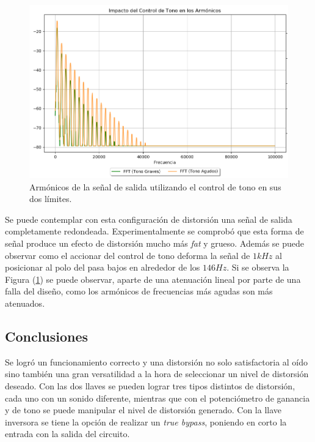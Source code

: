 \begin{figure}[H]
	\centering
	\includegraphics[width=1\textwidth, trim={0 0 0 0}, clip]{Ejercicio5/Imagenes/Propuesto/Mediciones/tono_en_hardsoft.png}
	\caption{Armónicos de la señal de salida utilizando el control de tono en sus dos límites.}
	\label{fig:control_tono}
\end{figure}

Se puede contemplar con esta configuración de distorsión una señal de salida completamente redondeada. Experimentalmente se comprobó que esta forma de señal produce un efecto de distorsión mucho más \textit{fat} y grueso. Además se puede observar como el accionar del control de tono deforma la señal de $1kHz$ al posicionar al polo del pasa bajos en alrededor de los $146Hz$. Si se observa la Figura (\ref{fig:control_tono}) se puede observar, aparte de una atenuación lineal por parte de una falla del diseño, como los armónicos de frecuencias más agudas son más atenuados.

\subsection{Conclusiones}

Se logró un funcionamiento correcto y una distorsión no solo satisfactoria al oído sino también una gran versatilidad a la hora de seleccionar un nivel de distorsión deseado. Con las dos llaves se pueden lograr tres tipos distintos de distorsión, cada uno con un sonido diferente, mientras que con el potenciómetro de ganancia y de tono se puede manipular el nivel de distorsión generado. Con la llave inversora se tiene la opción de realizar un \textit{true bypass}, poniendo en corto la entrada con la salida del circuito.

